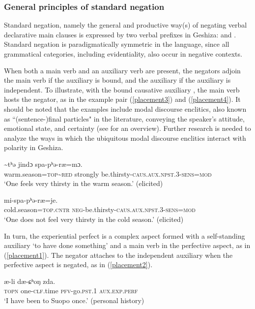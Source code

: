 \documentclass[output=paper,colorlinks,citecolor=brown]{langscibook}
\begin{document}
\subsubsection{General principles of standard negation}
Standard negation, namely the general and productive way(s) of negating verbal declarative main clauses \citep{Miestamo2005, Payne1985} is expressed by two verbal prefixes in Geshiza:  and . Standard negation is paradigmatically symmetric in the language, since all grammatical categories, including evidentiality, also occur in negative contexts. 

When both a main verb and an auxiliary verb are present, the negators adjoin the main verb if the auxiliary is bound, and the auxiliary if the auxiliary is independent. To illustrate, with the bound causative auxiliary , the main verb hosts the negator, as in the example pair (\ref{placement3}) and (\ref{placement4}). It should be noted that the examples include modal discourse enclitics, also known as ``(sentence-)final particles" in the literature, conveying the speaker’s attitude, emotional state, and certainty (see \citealt[574--579]{Honkasalo2019} for an overview). Further research is needed to analyze the ways in which the ubiquitous modal discourse enclitics interact with polarity in Geshiza.

\ea 
\label{placement3}
\textasciitilde {tʰə} 		{jindɔ} 	{spa-pʰə-ræ=mɔ}.\\  
     warm.season=\textsc{top\textasciitilde red}  strongly be.thirsty-\textsc{caus.aux.npst.}3-\textsc{sens=mod}\\
\glt `One feels very thirsty in the warm season.' (elicited)
\z

\ea
\label{placement4}
	{mi-spa-pʰə-ræ=je.}\\  
     cold.season=\textsc{top.cntr} \textsc{neg-}be.thirsty-\textsc{caus.aux.npst.}3-\textsc{sens=mod}\\
\glt `One does not feel very thirsty in the cold season.' (elicited)
\z

\noindent
In turn, the experiential perfect is a complex aspect formed with a self-standing auxiliary  `to have done something' and a main verb in the perfective aspect, as in (\ref{placement1}). The negator attaches to the independent auxiliary when the perfective aspect is negated, as in (\ref{placement2}).

\ea
\label{placement1}
 {æ-li} {dæ-ɕʰoŋ} {zda}. \\  
     \textsc{topn} one-\textsc{clf}.time  \textsc{pfv}-go.\textsc{pst.1} \textsc{aux.exp.perf}\\
\glt `I have been to Suopo once.' (personal history)
\z
\end{document}
